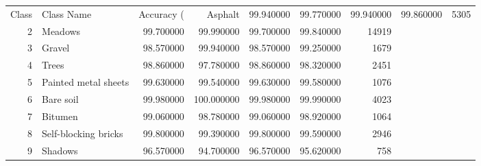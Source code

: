\begin{tabular}{rlrrrrr}
\toprule
Class & Class Name & Accuracy (%
 & Asphalt & 99.940000 & 99.770000 & 99.940000 & 99.860000 & 5305 \\
2 & Meadows & 99.700000 & 99.990000 & 99.700000 & 99.840000 & 14919 \\
3 & Gravel & 98.570000 & 99.940000 & 98.570000 & 99.250000 & 1679 \\
4 & Trees & 98.860000 & 97.780000 & 98.860000 & 98.320000 & 2451 \\
5 & Painted metal sheets & 99.630000 & 99.540000 & 99.630000 & 99.580000 & 1076 \\
6 & Bare soil & 99.980000 & 100.000000 & 99.980000 & 99.990000 & 4023 \\
7 & Bitumen & 99.060000 & 98.780000 & 99.060000 & 98.920000 & 1064 \\
8 & Self-blocking bricks & 99.800000 & 99.390000 & 99.800000 & 99.590000 & 2946 \\
9 & Shadows & 96.570000 & 94.700000 & 96.570000 & 95.620000 & 758 \\
\bottomrule
\end{tabular}
